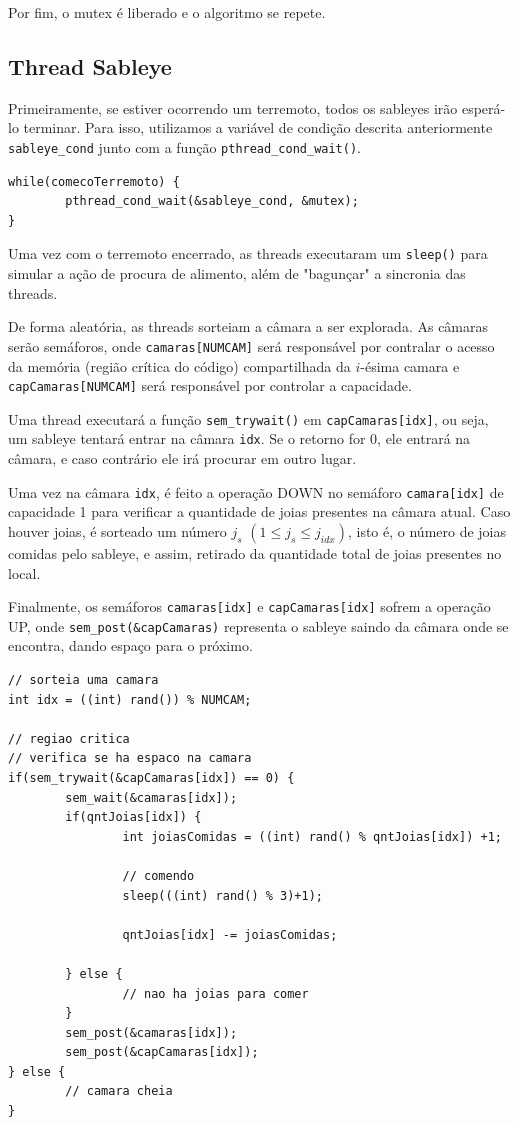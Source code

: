 \documentclass{article}
\begin{document}
Por fim, o mutex é liberado e o algoritmo se repete.

\subsection{Thread Sableye}
Primeiramente, se estiver ocorrendo um terremoto, todos os sableyes irão esperá-lo terminar. Para isso, utilizamos a variável de condição descrita anteriormente \verb|sableye_cond| junto com a função \verb|pthread_cond_wait()|.

\begin{lstlisting}
while(comecoTerremoto) {
        pthread_cond_wait(&sableye_cond, &mutex);
}
\end{lstlisting}

Uma vez com o terremoto encerrado, as threads executaram um \verb|sleep()| para simular a ação de procura de alimento, além de "bagunçar" a sincronia das threads.

De forma aleatória, as threads sorteiam a câmara a ser explorada. As câmaras serão semáforos, onde \verb|camaras[NUMCAM]| será responsável por contralar o acesso da memória (região crítica do código) compartilhada da $i$-ésima camara e \verb|capCamaras[NUMCAM]| será responsável por controlar a capacidade.

Uma thread executará a função \verb|sem_trywait()| em \verb|capCamaras[idx]|, ou seja, um sableye tentará entrar na câmara \verb|idx|. Se o retorno for 0, ele entrará na câmara, e caso contrário ele irá procurar em outro lugar.

Uma vez na câmara \verb|idx|, é feito a operação DOWN no semáforo \verb|camara[idx]| de capacidade 1 para verificar a quantidade de joias presentes na câmara atual. Caso houver joias, é sorteado um número $j_s$ $(1\leq j_s \leq j_{idx})$, isto é, o número de joias comidas pelo sableye, e assim, retirado da quantidade total de joias presentes no local.

Finalmente, os semáforos \verb|camaras[idx]| e \verb|capCamaras[idx]| sofrem a operação UP, onde \verb|sem_post(&capCamaras)| representa o sableye saindo da câmara onde se encontra, dando espaço para o próximo.

\begin{lstlisting}
// sorteia uma camara
int idx = ((int) rand()) % NUMCAM;

// regiao critica
// verifica se ha espaco na camara
if(sem_trywait(&capCamaras[idx]) == 0) {
        sem_wait(&camaras[idx]);
        if(qntJoias[idx]) {
                int joiasComidas = ((int) rand() % qntJoias[idx]) +1;

                // comendo
                sleep(((int) rand() % 3)+1);

                qntJoias[idx] -= joiasComidas;

        } else {
                // nao ha joias para comer
        }    
        sem_post(&camaras[idx]);
        sem_post(&capCamaras[idx]);
} else {
        // camara cheia
}
\end{lstlisting}
\end{document}
